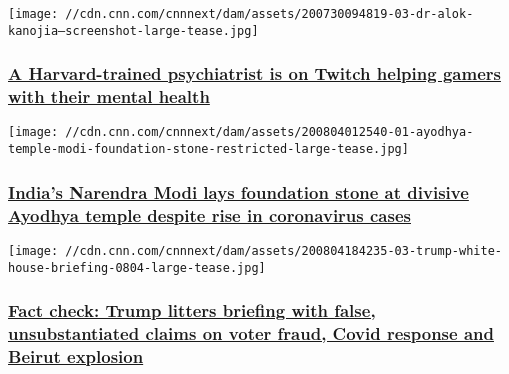 \href{/2020/08/05/tech/dr-k-healthy-gamer-gg-twitch-wellness/index.html}{}

\texttt{[image: //cdn.cnn.com/cnnnext/dam/assets/200730094819-03-dr-alok-kanojia---screenshot-large-tease.jpg]}

\hypertarget{a-harvard-trained-psychiatrist-is-on-twitch-helping-gamers-with-their-mental-health-1}{%
\subsubsection{\texorpdfstring{\href{/2020/08/05/tech/dr-k-healthy-gamer-gg-twitch-wellness/index.html}{A
Harvard-trained psychiatrist is on Twitch helping gamers with their
mental
health}}{A Harvard-trained psychiatrist is on Twitch helping gamers with their mental health}}\label{a-harvard-trained-psychiatrist-is-on-twitch-helping-gamers-with-their-mental-health-1}}

\href{/2020/08/04/asia/ayodhya-temple-modi-foundation-stone-intl-hnk/index.html}{}

\texttt{[image: //cdn.cnn.com/cnnnext/dam/assets/200804012540-01-ayodhya-temple-modi-foundation-stone-restricted-large-tease.jpg]}

\hypertarget{indias-narendra-modi-lays-foundation-stone-at-divisive-ayodhya-temple-despite-rise-in-coronavirus-cases}{%
\subsubsection{\texorpdfstring{\href{/2020/08/04/asia/ayodhya-temple-modi-foundation-stone-intl-hnk/index.html}{India's
Narendra Modi lays foundation stone at divisive Ayodhya temple despite
rise in coronavirus
cases}}{India's Narendra Modi lays foundation stone at divisive Ayodhya temple despite rise in coronavirus cases}}\label{indias-narendra-modi-lays-foundation-stone-at-divisive-ayodhya-temple-despite-rise-in-coronavirus-cases}}

\href{/2020/08/04/politics/fact-check-aug-4-coronavirus-briefing-trump/index.html}{}

\texttt{[image: //cdn.cnn.com/cnnnext/dam/assets/200804184235-03-trump-white-house-briefing-0804-large-tease.jpg]}

\hypertarget{fact-check-trump-litters-briefing-with-false-unsubstantiated-claims-on-voter-fraud-covid-response-and-beirut-explosion}{%
\subsubsection{\texorpdfstring{\href{/2020/08/04/politics/fact-check-aug-4-coronavirus-briefing-trump/index.html}{Fact
check: Trump litters briefing with false, unsubstantiated claims on
voter fraud, Covid response and Beirut
explosion}}{Fact check: Trump litters briefing with false, unsubstantiated claims on voter fraud, Covid response and Beirut explosion}}\label{fact-check-trump-litters-briefing-with-false-unsubstantiated-claims-on-voter-fraud-covid-response-and-beirut-explosion}}


